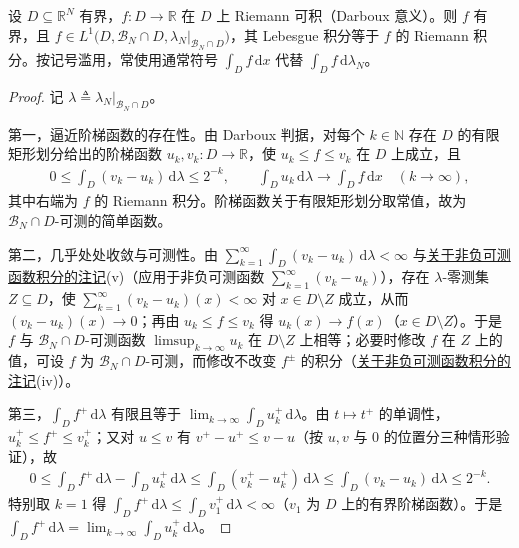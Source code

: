\documentclass[../../main.tex]{subfiles}%
\begin{document}
\begin{remark}\label{remark:ch02-Riemann可积}
设 $D\subseteq\mathbb R^N$ 有界，$f:D\to\mathbb R$ 在 $D$ 上 Riemann 可积（Darboux 意义）。则 $f$ 有界，且 $f\in L^1\big(D,\mathscr B_N\cap D,\lambda_N|_{\mathscr B_N\cap D}\big)$，其 Lebesgue 积分等于 $f$ 的 Riemann 积分。按记号滥用，常使用通常符号 $\int_Df\,\mathrm{d}x$ 代替 $\int_Df\,\mathrm{d}\lambda_N$。
\end{remark}

\begin{proof}
记 $\lambda\triangleq\lambda_N|_{\mathscr B_N\cap D}$。

第一，逼近阶梯函数的存在性。由 Darboux 判据，对每个 $k\in\mathbb N$ 存在 $D$ 的有限矩形划分给出的阶梯函数 $u_k,v_k:D\to\mathbb R$，使 $u_k\leqslant f\leqslant v_k$ 在 $D$ 上成立，且
\begin{align*}
0\leqslant\int_D(v_k-u_k)\,\mathrm{d}\lambda\leqslant2^{-k},\qquad\int_Du_k\,\mathrm{d}\lambda\longrightarrow\int_Df\,\mathrm{d}x\quad(k\to\infty),
\end{align*}
其中右端为 $f$ 的 Riemann 积分。阶梯函数关于有限矩形划分取常值，故为 $\mathscr B_N\cap D$-可测的简单函数。

第二，几乎处处收敛与可测性。由 $\sum_{k=1}^\infty\int_D(v_k-u_k)\,\mathrm{d}\lambda<\infty$ 与\hyperref[remark:ch02-非负可测积分动机]{关于非负可测函数积分的注记}(v)（应用于非负可测函数 $\sum_{k=1}^\infty(v_k-u_k)$），存在 $\lambda$-零测集 $Z\subseteq D$，使 $\sum_{k=1}^\infty(v_k-u_k)(x)<\infty$ 对 $x\in D\setminus Z$ 成立，从而 $(v_k-u_k)(x)\to0$；再由 $u_k\leqslant f\leqslant v_k$ 得 $u_k(x)\to f(x)$（$x\in D\setminus Z$）。于是 $f$ 与 $\mathscr B_N\cap D$-可测函数 $\limsup_{k\to\infty}u_k$ 在 $D\setminus Z$ 上相等；必要时修改 $f$ 在 $Z$ 上的值，可设 $f$ 为 $\mathscr B_N\cap D$-可测，而修改不改变 $f^\pm$ 的积分（\hyperref[remark:ch02-非负可测积分动机]{关于非负可测函数积分的注记}(iv)）。

第三，$\int_Df^+\,\mathrm{d}\lambda$ 有限且等于 $\lim_{k\to\infty}\int_Du_k^+\,\mathrm{d}\lambda$。由 $t\mapsto t^+$ 的单调性，$u_k^+\leqslant f^+\leqslant v_k^+$；又对 $u\leqslant v$ 有 $v^+-u^+\leqslant v-u$（按 $u,v$ 与 $0$ 的位置分三种情形验证），故
\begin{align*}
0\leqslant\int_Df^+\,\mathrm{d}\lambda-\int_Du_k^+\,\mathrm{d}\lambda\leqslant\int_D(v_k^+-u_k^+)\,\mathrm{d}\lambda\leqslant\int_D(v_k-u_k)\,\mathrm{d}\lambda\leqslant2^{-k}.
\end{align*}
特别取 $k=1$ 得 $\int_Df^+\,\mathrm{d}\lambda\leqslant\int_Dv_1^+\,\mathrm{d}\lambda<\infty$（$v_1$ 为 $D$ 上的有界阶梯函数）。于是 $\int_Df^+\,\mathrm{d}\lambda=\lim_{k\to\infty}\int_Du_k^+\,\mathrm{d}\lambda$。


\end{proof}
\end{document}
